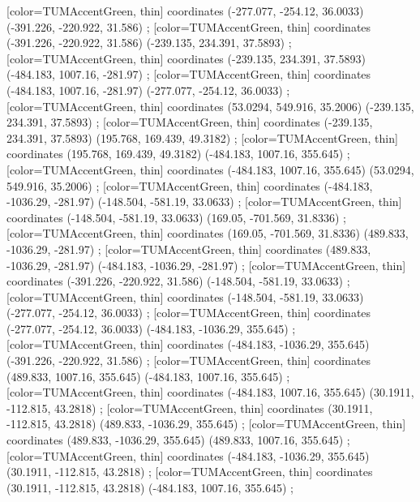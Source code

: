         [color=TUMAccentGreen, thin] coordinates { (-277.077, -254.12, 36.0033) (-391.226, -220.922, 31.586) };
        [color=TUMAccentGreen, thin] coordinates { (-391.226, -220.922, 31.586) (-239.135, 234.391, 37.5893) };
        [color=TUMAccentGreen, thin] coordinates { (-239.135, 234.391, 37.5893) (-484.183, 1007.16, -281.97) };
        [color=TUMAccentGreen, thin] coordinates { (-484.183, 1007.16, -281.97) (-277.077, -254.12, 36.0033) };
        [color=TUMAccentGreen, thin] coordinates { (53.0294, 549.916, 35.2006) (-239.135, 234.391, 37.5893) };
        [color=TUMAccentGreen, thin] coordinates { (-239.135, 234.391, 37.5893) (195.768, 169.439, 49.3182) };
        [color=TUMAccentGreen, thin] coordinates { (195.768, 169.439, 49.3182) (-484.183, 1007.16, 355.645) };
        [color=TUMAccentGreen, thin] coordinates { (-484.183, 1007.16, 355.645) (53.0294, 549.916, 35.2006) };
        [color=TUMAccentGreen, thin] coordinates { (-484.183, -1036.29, -281.97) (-148.504, -581.19, 33.0633) };
        [color=TUMAccentGreen, thin] coordinates { (-148.504, -581.19, 33.0633) (169.05, -701.569, 31.8336) };
        [color=TUMAccentGreen, thin] coordinates { (169.05, -701.569, 31.8336) (489.833, -1036.29, -281.97) };
        [color=TUMAccentGreen, thin] coordinates { (489.833, -1036.29, -281.97) (-484.183, -1036.29, -281.97) };
        [color=TUMAccentGreen, thin] coordinates { (-391.226, -220.922, 31.586) (-148.504, -581.19, 33.0633) };
        [color=TUMAccentGreen, thin] coordinates { (-148.504, -581.19, 33.0633) (-277.077, -254.12, 36.0033) };
        [color=TUMAccentGreen, thin] coordinates { (-277.077, -254.12, 36.0033) (-484.183, -1036.29, 355.645) };
        [color=TUMAccentGreen, thin] coordinates { (-484.183, -1036.29, 355.645) (-391.226, -220.922, 31.586) };
        [color=TUMAccentGreen, thin] coordinates { (489.833, 1007.16, 355.645) (-484.183, 1007.16, 355.645) };
        [color=TUMAccentGreen, thin] coordinates { (-484.183, 1007.16, 355.645) (30.1911, -112.815, 43.2818) };
        [color=TUMAccentGreen, thin] coordinates { (30.1911, -112.815, 43.2818) (489.833, -1036.29, 355.645) };
        [color=TUMAccentGreen, thin] coordinates { (489.833, -1036.29, 355.645) (489.833, 1007.16, 355.645) };
        [color=TUMAccentGreen, thin] coordinates { (-484.183, -1036.29, 355.645) (30.1911, -112.815, 43.2818) };
        [color=TUMAccentGreen, thin] coordinates { (30.1911, -112.815, 43.2818) (-484.183, 1007.16, 355.645) };
